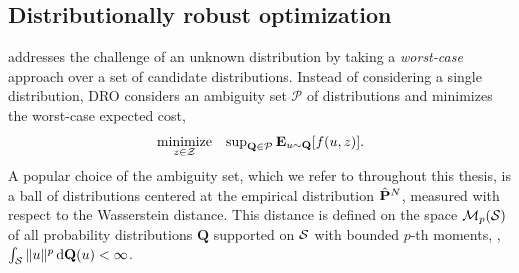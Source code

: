 \subsection{Distributionally robust optimization}
\label{sec:dro_def}

 addresses the challenge of an unknown distribution by taking a {\it worst-case} approach over a set of candidate distributions.
Instead of considering a single distribution, \gls{DRO} considers an ambiguity set $\mathcal{P}$ of distributions and minimizes the worst-case expected cost,
\begin{equation}
\label{eq:dro_prob_intro}
	\begin{array}{ll}
		\underset{z \in \mathcal{Z}}{\text{minimize}} & \sup_{\mathbf{Q} \in \mathcal{P}} \mathbf{E}_{u \sim \mathbf{Q}}[f(u,z)].
	\end{array}
\end{equation}
A popular choice of the ambiguity set, which we refer to throughout this thesis, is a ball of distributions centered at the empirical distribution $\hat{{\mathbf P}}^N$, measured with respect to the Wasserstein distance. This distance is defined on the space $\mathcal{M}_p(\mathcal{S})$ of all probability distributions $\mathbf{Q}$ supported on $\mathcal{S}$ with bounded $p$-th moments, \ie, $\int_{\mathcal{S}} \|u\|^p \, \mathrm{d}\mathbf{Q}(u) < \infty$.

